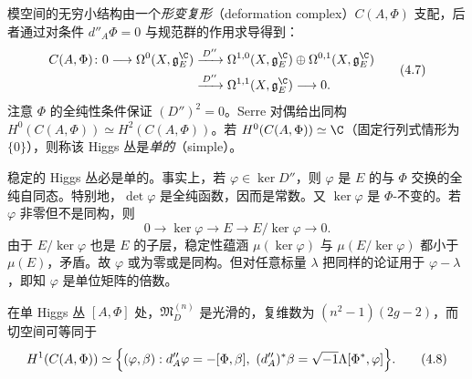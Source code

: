 模空间的无穷小结构由一个\emph{形变复形}（deformation complex）$C(A,\Phi)$ 支配，后者通过对条件 $d''_A\Phi=0$ 与规范群的作用求导得到：
\begin{equation}
\begin{aligned}
C(A,\Phi)\colon 0\longrightarrow\Omega^0(X,\mathfrak{g}^\C_E)&\xrightarrow{\,D''\,}\Omega^{1,0}(X,\mathfrak{g}^\C_E)\oplus\Omega^{0,1}(X,\mathfrak{g}^\C_E)\\
&\xrightarrow{\,D''\,}\Omega^{1,1}(X,\mathfrak{g}^\C_E)\longrightarrow0.
\end{aligned}
\label{eq:4.7}\tag{4.7}
\end{equation}
注意 $\Phi$ 的全纯性条件保证 $(D'')^2=0$。Serre 对偶给出同构 $H^0(C(A,\Phi))\simeq H^2(C(A,\Phi))$。若 $H^0(C(A,\Phi))\simeq\C$（固定行列式情形为 $\{0\}$），则称该 Higgs 丛是\emph{单的}（simple）。

\begin{remark}\label{rem:4.2.12}
稳定的 Higgs 丛必是单的。事实上，若 $\varphi\in\ker D''$，则 $\varphi$ 是 $E$ 的与 $\Phi$ 交换的全纯自同态。特别地，$\det\varphi$ 是全纯函数，因而是常数。又 $\ker\varphi$ 是 $\Phi$-不变的。若 $\varphi$ 非零但不是同构，则
\[
0\longrightarrow\ker\varphi\longrightarrow E\longrightarrow E/\ker\varphi\longrightarrow0.
\]
由于 $E/\ker\varphi$ 也是 $E$ 的子层，稳定性蕴涵 $\mu(\ker\varphi)$ 与 $\mu(E/\ker\varphi)$ 都小于 $\mu(E)$，矛盾。故 $\varphi$ 或为零或是同构。但对任意标量 $\lambda$ 把同样的论证用于 $\varphi-\lambda$，即知 $\varphi$ 是单位矩阵的倍数。
\end{remark}

\begin{proposition}\label{prop:4.2.13}
在单 Higgs 丛 $[A,\Phi]$ 处，$\mathfrak{M}_D^{(n)}$ 是光滑的，复维数为 $(n^2-1)(2g-2)$，而切空间可等同于
\begin{equation}
H^1(C(A,\Phi))\simeq\Bigl\{(\varphi,\beta): d''_A\varphi=-[\Phi,\beta],\ (d''_A)^*\beta=\sqrt{-1}\Lambda[\Phi^*,\varphi]\Bigr\}.
\label{eq:4.8}\tag{4.8}
\end{equation}
\end{proposition}

